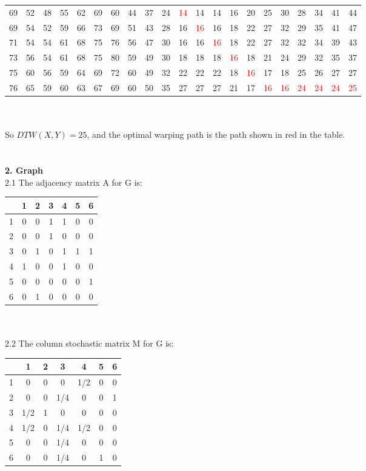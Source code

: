 \documentclass[11pt,a4paper,fleqn]{article}
\begin{document}
\begin{tabular}{|l|cccccccccccccccccccc|}
69&52&48&55&62&69&60&44&37&24&\textcolor{red}{14}&14&14&16&20&25&30&28&34&41&44\\
69&54&52&59&66&73&69&51&43&28&16&\textcolor{red}{16}&16&18&22&27&32&29&35&41&47\\
71&54&54&61&68&75&76&56&47&30&16&16&\textcolor{red}{16}&18&22&27&32&32&34&39&43\\
73&56&54&61&68&75&80&59&49&30&18&18&18&\textcolor{red}{16}&18&21&24&29&32&35&37\\
75&60&56&59&64&69&72&60&49&32&22&22&22&18&\textcolor{red}{16}&17&18&25&26&27&27\\
76&65&59&60&63&67&69&60&50&35&27&27&27&21&17&\textcolor{red}{16}&\textcolor{red}{16}&\textcolor{red}{24}&\textcolor{red}{24}&\textcolor{red}{24}&\textcolor{red}{25}\\
\hline
\end{tabular}\\ \\
So $DTW(X,Y)=25$, and the optimal warping path is the path shown in red in the table.\\ \\ \\
\textbf{2. Graph}\\
2.1 The adjacency matrix A for G is:\\
\begin{tabular}{c|cccccc}
&1&2&3&4&5&6\\
\hline
1&0&0&1&1&0&0\\
2&0&0&1&0&0&0\\
3&0&1&0&1&1&1\\
4&1&0&0&1&0&0\\
5&0&0&0&0&0&1\\
6&0&1&0&0&0&0\\
\end{tabular}\\ \\ 
2.2 The column stochastic matrix M for G is:\\
\begin{tabular}{c|cccccc}
&1&2&3&4&5&6\\
\hline
1&0&0&0&1/2&0&0\\
2&0&0&1/4&0&0&1\\
3&1/2&1&0&0&0&0\\
4&1/2&0&1/4&1/2&0&0\\
5&0&0&1/4&0&0&0\\
6&0&0&1/4&0&1&0\\
\end{tabular}\\ 
\newpage \noindent
\end{document}
